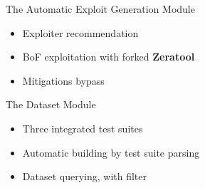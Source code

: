 \begin{frame}{The Automatic Exploit Generation Module}
    \begin{figure}
        \centering
        \hspace{1em}
    \end{figure}
    \vfill
    \pause

    \begin{itemize}
        \item Exploiter recommendation\pause
        \item BoF exploitation with forked \textbf{Zeratool}\pause
        \item Mitigations bypass
    \end{itemize}
\end{frame}

\begin{frame}{The Dataset Module}
    \begin{figure}
        \centering
        \hspace{1em}
        \hspace{1em}
    \end{figure}
    \vfill
    \pause

    \begin{itemize}
        \item Three integrated test suites\pause
        \item Automatic building by test suite parsing\pause
        \item Dataset querying, with filter
    \end{itemize}
\end{frame}